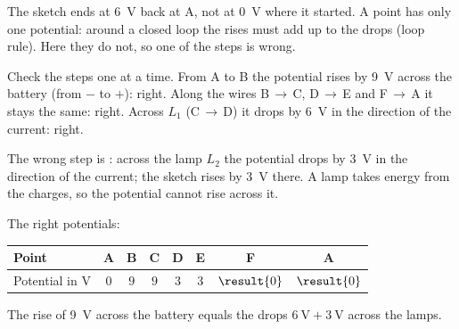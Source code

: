 \begin{abcliste}
\abc The sketch ends at \SI{6}{\V} back at A, not at \SI{0}{\V} where it started. A point has only one potential: around a closed loop the rises must add up to the drops (loop rule). Here they do not, so one of the steps is wrong.

\abc Check the steps one at a time. From A to B the potential rises by \SI{9}{\V} across the battery (from $-$ to $+$): right. Along the wires B\,$\to$\,C, D\,$\to$\,E and F\,$\to$\,A it stays the same: right. Across $L_1$ (C\,$\to$\,D) it drops by \SI{6}{\V} in the direction of the current: right.

The wrong step is : across the lamp $L_2$ the potential drops by \SI{3}{\V} in the direction of the current; the sketch rises by \SI{3}{\V} there. A lamp takes energy from the charges, so the potential cannot rise across it.

\abc The right potentials:
\begin{center}
\begin{tabular}{l|ccccccc}
 Point & A & B & C & D & E & F & A \\ \hline
 Potential in \si{\V} & $0$ & $9$ & $9$ & $3$ & $3$ & $\result{0}$ & $\result{0}$ \\
\end{tabular}

\medskip
{}
\end{center}
The rise of \SI{9}{\V} across the battery equals the drops $\SI{6}{\V} + \SI{3}{\V}$ across the lamps.
\end{abcliste}
